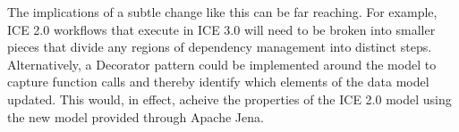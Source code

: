 The implications of a subtle change like this can be far reaching. For example,
ICE 2.0 workflows that execute in ICE 3.0 will need to be broken into smaller
pieces that divide any regions of dependency management into distinct steps.
Alternatively, a Decorator pattern could be implemented around the model to
capture function calls and thereby identify which elements of the data model
updated. This would, in effect, acheive the properties of the ICE 2.0 model
using the new model provided through Apache Jena.
